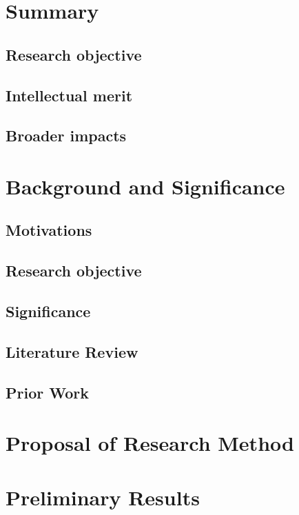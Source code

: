 \section{Summary}

\subsection{Research objective}

\subsection{Intellectual merit}

\subsection{Broader impacts}

\section{Background and Significance}

\subsection{Motivations}

\subsection{Research objective}

\subsection{Significance}

\subsection{Literature Review}

\subsection{Prior Work}

\section{Proposal of Research Method}

\section{Preliminary Results}



